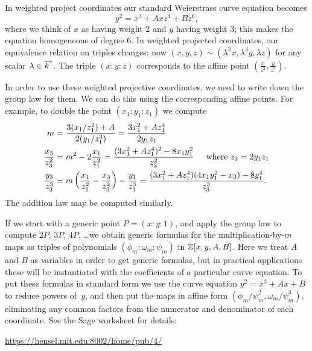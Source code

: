 In weighted project coordinates our standard Weierstrass curve equation becomes
\[y^2 = x^3 + Axz^4 + Bz^6,\]
where we think of $x$ as having weight 2 and $y$ having weight 3; this makes the equation homogeneous of degree 6.
In weighted projected coordinates, our equivalence relation on triples changes: now $(x,y,z)\sim (\lambda^2x,\lambda^3y,\lambda z)$ for any scalar $\lambda\in\overline{k}^*$.
The triple $(x:y:z)$ corresponds to the affine point $\left(\frac{x}{z^2},\frac{y}{z^3}\right)$.
%

In order to use these weighted projective coordinates, we need to write down the group law for them.
We can do this using the corresponding affine points.
For example, to double the point $(x_1:y_1:z_1)$ we compute
\begin{align*}
m & = \frac{3(x_1/z_1^2)+A}{2(y_1/z_1^3)} = \frac{3x_1^2+Az_1^4}{2y_1z_1}\\
\frac{x_3}{z_3^2} & = m^2 - 2\frac{x_1}{z_1^2} = \frac{(3x_1^2+Az_1^4)^2-8x_1y_1^2}{z_3^2} \hspace{5mm}\text{where } z_3 = 2y_1z_1\\
\frac{y_3}{z_3^3} & = m\left(\frac{x_1}{z_1^2} - \frac{x_3}{z_3^2}\right)-\frac{y_1}{z_1^3} = \frac{(3x_1^2+Az_1^4)(4x_1y_1^2-x_3)-8y_1^4}{z_3^3}.
\end{align*}
The addition law may be computed similarly.

If we start with a generic point $P=(x:y:1)$, and apply the group law to compute $2P$, $3P$, $4P$, \ldots we obtain generic formulas for the multiplication-by-$m$ maps as triples of polynomials $(\phi_m : \omega_m : \psi_m)$ in $\mathbb{Z}[x,y,A,B]$.  Here we treat $A$ and $B$ as variables in order to get generic formulas, but in practical applications these will be instantiated with the coefficients of a particular curve equation.
To put these formulas in standard form we use the curve equation $y^2=x^3+Ax+B$ to reduce powers of~$y$, and then put the maps in affine form $(\phi_m/\psi_m^2, \omega_m/\psi_m^3)$, eliminating any common factors from the numerator and denominator of each coordinate. See the Sage worksheet for details:
\begin{center}
\url{https://hensel.mit.edu:8002/home/pub/4/}
\end{center}

